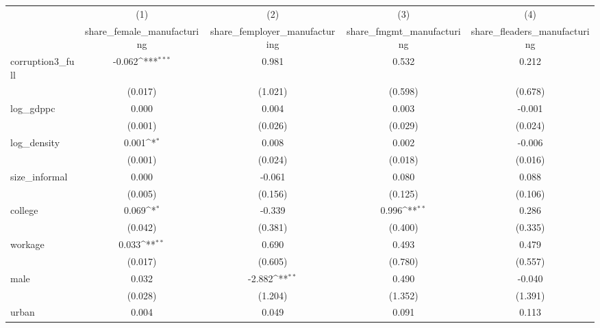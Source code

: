 {
\def\sym#1{\ifmmode^{#1}\else\(^{#1}\)\fi}
\begin{tabular}{l*{4}{c}}
\hline\hline
            &\multicolumn{1}{c}{(1)}&\multicolumn{1}{c}{(2)}&\multicolumn{1}{c}{(3)}&\multicolumn{1}{c}{(4)}\\
            &\multicolumn{1}{c}{share\_female\_manufacturing}&\multicolumn{1}{c}{share\_femployer\_manufacturing}&\multicolumn{1}{c}{share\_fmgmt\_manufacturing}&\multicolumn{1}{c}{share\_fleaders\_manufacturing}\\
\hline
corruption3\_full&      -0.062\sym{***}&       0.981         &       0.532         &       0.212         \\
            &     (0.017)         &     (1.021)         &     (0.598)         &     (0.678)         \\
[1em]
log\_gdppc   &       0.000         &       0.004         &       0.003         &      -0.001         \\
            &     (0.001)         &     (0.026)         &     (0.029)         &     (0.024)         \\
[1em]
log\_density &       0.001\sym{*}  &       0.008         &       0.002         &      -0.006         \\
            &     (0.001)         &     (0.024)         &     (0.018)         &     (0.016)         \\
[1em]
size\_informal&       0.000         &      -0.061         &       0.080         &       0.088         \\
            &     (0.005)         &     (0.156)         &     (0.125)         &     (0.106)         \\
[1em]
college     &       0.069\sym{*}  &      -0.339         &       0.996\sym{**} &       0.286         \\
            &     (0.042)         &     (0.381)         &     (0.400)         &     (0.335)         \\
[1em]
workage     &       0.033\sym{**} &       0.690         &       0.493         &       0.479         \\
            &     (0.017)         &     (0.605)         &     (0.780)         &     (0.557)         \\
[1em]
male        &       0.032         &      -2.882\sym{**} &       0.490         &      -0.040         \\
            &     (0.028)         &     (1.204)         &     (1.352)         &     (1.391)         \\
[1em]
urban       &       0.004         &       0.049         &       0.091         &       0.113         \\

\end{tabular}}
